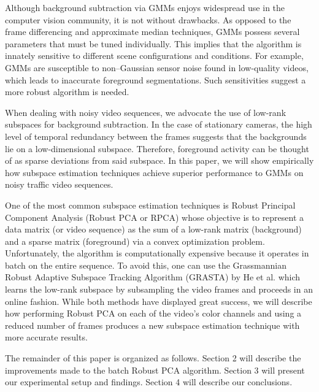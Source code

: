 \documentclass{article}
\begin{document}
Although background subtraction via GMMs enjoys widespread use in the computer vision community, it is not without drawbacks. As opposed to the frame differencing and approximate median techniques, GMMs possess several parameters that must be tuned individually. This implies that the algorithm is innately sensitive to different scene configurations and conditions. For example, GMMs are susceptible to non--Gaussian sensor noise found in low-quality videos, which leads to inaccurate foreground segmentations. Such sensitivities suggest a more robust algorithm is needed.


When dealing with noisy video sequences, we advocate the use of low-rank subspaces for background subtraction.  %
In the case of stationary cameras, the high level of temporal redundancy between the frames suggests that the backgrounds lie on a low-dimensional subspace. Therefore, foreground activity can be thought of as sparse deviations from said subspace. In this paper, we will show empirically how subspace estimation techniques achieve superior performance to GMMs on noisy traffic video sequences. 

One of the most common subspace estimation techniques is Robust Principal Component Analysis (Robust PCA or RPCA) \cite{RPCA09} whose objective is to represent a data matrix (or video sequence) as the sum of a low-rank matrix (background) and a sparse matrix (foreground) via a convex optimization problem. Unfortunately, the algorithm is computationally expensive because it operates in batch on the entire sequence. To avoid this, one can use the Grassmannian Robust Adaptive Subspace Tracking Algorithm (GRASTA) by He et al. \cite{GRASTA12} which learns the low-rank subspace by subsampling the video frames and proceeds in an online fashion. While both methods have displayed great success, we will describe how performing Robust PCA on each of the video's color channels and using a reduced number of frames produces a new subspace estimation technique with more accurate results. 


The remainder of this paper is organized as follows. Section 2 will describe the improvements made to the batch Robust PCA algorithm. Section 3 will present our experimental setup and findings. Section 4 will describe our conclusions.
\end{document}
